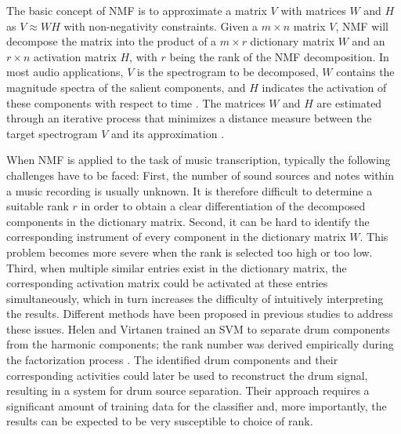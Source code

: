 \documentclass[a4paper]{article}
\begin{document}
The basic concept of NMF is to approximate a matrix $V$ with matrices $W$ and $H$ as $V \approx WH$ with non-negativity constraints. Given a $m \times n$ matrix $V$, NMF will decompose the matrix into the product of a $m \times r$ dictionary matrix $W$ and an $r \times n$ activation matrix $H$, with $r$ being the rank of the NMF decomposition. In most audio applications, $V$ is the spectrogram to be decomposed, $W$ contains the magnitude spectra of the salient components, and $H$ indicates the activation of these components with respect to time \cite{smaragdis_non-negative_2003}. The matrices $W$ and $H$ are estimated through an iterative process that minimizes a distance measure between the target spectrogram $V$ and its approximation \cite{lee_algorithms_2000}. 

When NMF is applied to the task of music transcription, typically the following challenges have to be faced:
First, the number of sound sources and notes within a music recording is usually unknown. It is therefore difficult to determine a suitable rank $r$ in order to obtain a clear differentiation of the decomposed components in the dictionary matrix. 
Second, it can be  hard to identify the corresponding instrument of every component in the dictionary matrix $W$. This problem becomes more severe when the rank is selected too high or too low. 
Third, when multiple similar entries exist in the dictionary matrix, the corresponding activation matrix could be activated at these entries simultaneously, which in turn increases the difficulty of intuitively interpreting the results. %
Different methods have been proposed in previous studies to address these issues. Helen and Virtanen trained an SVM to separate drum components from the harmonic components; the rank number was derived empirically during the factorization process \cite{helen_separation_2005}. The identified drum components and their corresponding activities could later be used to reconstruct the drum signal, resulting in a system for drum source separation. Their approach requires a significant amount of training data for the classifier and, more importantly, the results can be expected to be very susceptible to choice of rank. %
\end{document}
